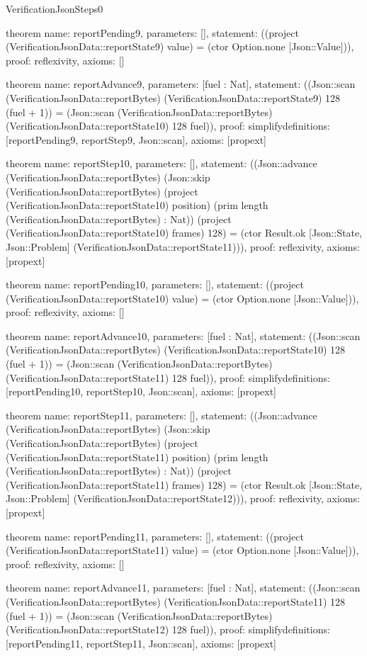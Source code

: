 \begin{lexlean}{VerificationJsonSteps0}
\begin{semanticmodule}
theorem{
  name: reportPending9,
  parameters: [],
  statement: ((project (VerificationJsonData::reportState9) value) = (ctor Option.none [Json::Value])),
  proof: reflexivity{},
  axioms: []
}

theorem{
  name: reportAdvance9,
  parameters: [fuel : Nat],
  statement: ((Json::scan (VerificationJsonData::reportBytes) (VerificationJsonData::reportState9) 128 (fuel + 1)) = (Json::scan (VerificationJsonData::reportBytes) (VerificationJsonData::reportState10) 128 fuel)),
  proof: simplify{definitions: [reportPending9, reportStep9, Json::scan]},
  axioms: [propext]
}

theorem{
  name: reportStep10,
  parameters: [],
  statement: ((Json::advance (VerificationJsonData::reportBytes) (Json::skip (VerificationJsonData::reportBytes) (project (VerificationJsonData::reportState10) position) (prim length (VerificationJsonData::reportBytes) : Nat)) (project (VerificationJsonData::reportState10) frames) 128) = (ctor Result.ok [Json::State, Json::Problem] (VerificationJsonData::reportState11))),
  proof: reflexivity{},
  axioms: [propext]
}

theorem{
  name: reportPending10,
  parameters: [],
  statement: ((project (VerificationJsonData::reportState10) value) = (ctor Option.none [Json::Value])),
  proof: reflexivity{},
  axioms: []
}

theorem{
  name: reportAdvance10,
  parameters: [fuel : Nat],
  statement: ((Json::scan (VerificationJsonData::reportBytes) (VerificationJsonData::reportState10) 128 (fuel + 1)) = (Json::scan (VerificationJsonData::reportBytes) (VerificationJsonData::reportState11) 128 fuel)),
  proof: simplify{definitions: [reportPending10, reportStep10, Json::scan]},
  axioms: [propext]
}

theorem{
  name: reportStep11,
  parameters: [],
  statement: ((Json::advance (VerificationJsonData::reportBytes) (Json::skip (VerificationJsonData::reportBytes) (project (VerificationJsonData::reportState11) position) (prim length (VerificationJsonData::reportBytes) : Nat)) (project (VerificationJsonData::reportState11) frames) 128) = (ctor Result.ok [Json::State, Json::Problem] (VerificationJsonData::reportState12))),
  proof: reflexivity{},
  axioms: [propext]
}

theorem{
  name: reportPending11,
  parameters: [],
  statement: ((project (VerificationJsonData::reportState11) value) = (ctor Option.none [Json::Value])),
  proof: reflexivity{},
  axioms: []
}

theorem{
  name: reportAdvance11,
  parameters: [fuel : Nat],
  statement: ((Json::scan (VerificationJsonData::reportBytes) (VerificationJsonData::reportState11) 128 (fuel + 1)) = (Json::scan (VerificationJsonData::reportBytes) (VerificationJsonData::reportState12) 128 fuel)),
  proof: simplify{definitions: [reportPending11, reportStep11, Json::scan]},
  axioms: [propext]
}


\end{semanticmodule}
\end{lexlean}
